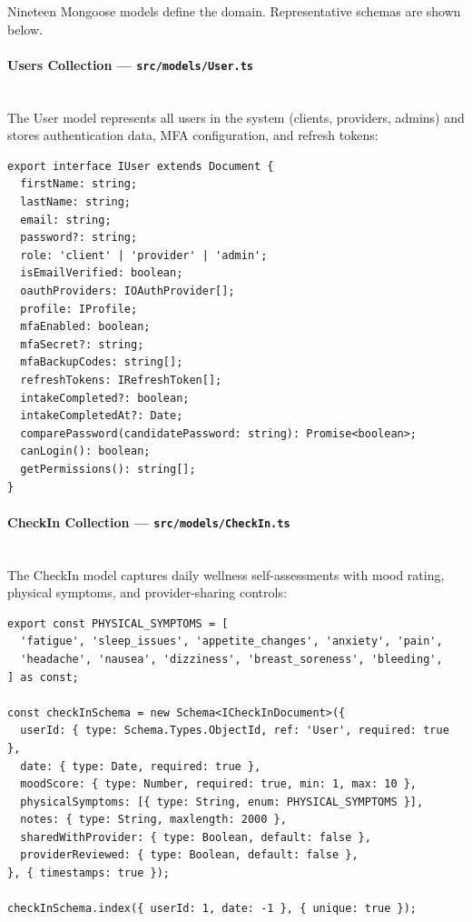 \documentclass[12pt,letterpaper]{article}
\begin{document}
Nineteen Mongoose models define the domain. Representative schemas are shown below.

\paragraph{Users Collection --- \texttt{src/models/User.ts}}
\mbox{}\\
The User model represents all users in the system (clients, providers, admins) and stores authentication data, MFA configuration, and refresh tokens:

\begin{lstlisting}[caption={User model interface (\texttt{User.ts})}]
export interface IUser extends Document {
  firstName: string;
  lastName: string;
  email: string;
  password?: string;
  role: 'client' | 'provider' | 'admin';
  isEmailVerified: boolean;
  oauthProviders: IOAuthProvider[];
  profile: IProfile;
  mfaEnabled: boolean;
  mfaSecret?: string;
  mfaBackupCodes: string[];
  refreshTokens: IRefreshToken[];
  intakeCompleted?: boolean;
  intakeCompletedAt?: Date;
  comparePassword(candidatePassword: string): Promise<boolean>;
  canLogin(): boolean;
  getPermissions(): string[];
}
\end{lstlisting}

\paragraph{CheckIn Collection --- \texttt{src/models/CheckIn.ts}}
\mbox{}\\
The CheckIn model captures daily wellness self-assessments with mood rating, physical symptoms, and provider-sharing controls:

\begin{lstlisting}[caption={CheckIn model with symptom tracking (\texttt{CheckIn.ts})}]
export const PHYSICAL_SYMPTOMS = [
  'fatigue', 'sleep_issues', 'appetite_changes', 'anxiety', 'pain',
  'headache', 'nausea', 'dizziness', 'breast_soreness', 'bleeding',
] as const;

const checkInSchema = new Schema<ICheckInDocument>({
  userId: { type: Schema.Types.ObjectId, ref: 'User', required: true },
  date: { type: Date, required: true },
  moodScore: { type: Number, required: true, min: 1, max: 10 },
  physicalSymptoms: [{ type: String, enum: PHYSICAL_SYMPTOMS }],
  notes: { type: String, maxlength: 2000 },
  sharedWithProvider: { type: Boolean, default: false },
  providerReviewed: { type: Boolean, default: false },
}, { timestamps: true });

checkInSchema.index({ userId: 1, date: -1 }, { unique: true });
\end{lstlisting}
\end{document}
